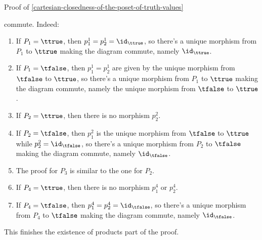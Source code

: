 \begin{Proof}{Proof of \cref{cartesian-closedness-of-the-poset-of-truth-values}}
\begin{scalemath}
        \quad
    \end{scalemath}
    commute. Indeed:
    \begin{enumerate}
        \item If $P_{1}=\ttrue$, then $p^{1}_{1}=p^{1}_{2}=\id_{\ttrue}$, so there's a unique morphism from $P_{1}$ to $\ttrue$ making the diagram commute, namely $\id_{\ttrue}$.
        \item If $P_{1}=\tfalse$, then $p^{1}_{1}=p^{1}_{2}$ are given by the unique morphism from $\tfalse$ to $\ttrue$, so there's a unique morphism from $P_{1}$ to $\ttrue$ making the diagram commute, namely the unique morphism from $\tfalse$ to $\ttrue$.
        \item If $P_{2}=\ttrue$, then there is no morphism $p^{2}_{2}$.
        \item If $P_{2}=\tfalse$, then $p^{2}_{1}$ is the unique morphism from $\tfalse$ to $\ttrue$ while $p^{2}_{2}=\id_{\tfalse}$, so there's a unique morphism from $P_{2}$ to $\tfalse$ making the diagram commute, namely $\id_{\tfalse}$.
        \item The proof for $P_{3}$ is similar to the one for $P_{2}$.
        \item If $P_{4}=\ttrue$, then there is no morphism $p^{4}_{1}$ or $p^{4}_{2}$.
        \item If $P_{4}=\tfalse$, then $p^{4}_{1}=p^{4}_{2}=\id_{\tfalse}$, so there's a unique morphism from $P_{4}$ to $\tfalse$ making the diagram commute, namely $\id_{\tfalse}$.
    \end{enumerate}
    This finishes the existence of products part of the proof.


\end{Proof}
